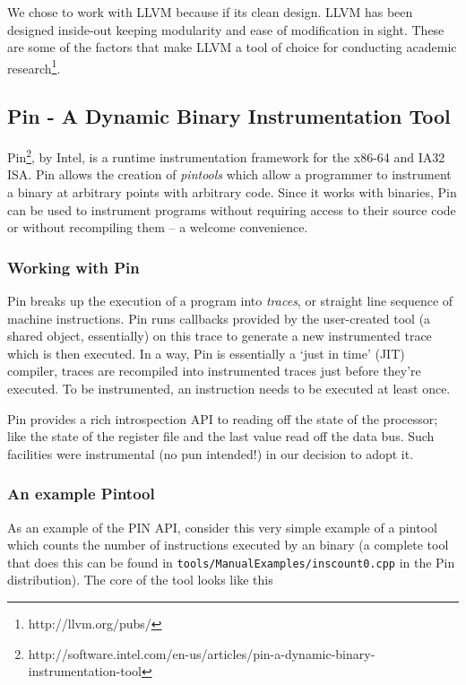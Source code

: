 We chose to work with LLVM because if its clean design.  LLVM has been
designed inside-out keeping modularity and ease of modification in
sight.  These are some of the factors that make LLVM a tool of choice
for conducting academic research\footnote{http://llvm.org/pubs/}.

\subsection{Pin - A Dynamic Binary Instrumentation Tool}

Pin\footnote{http://software.intel.com/en-us/articles/pin-a-dynamic-binary-instrumentation-tool},
by Intel, is a runtime instrumentation framework for the x86-64 and
IA32 ISA.  Pin allows the creation of \textit{pintools} which allow a
programmer to instrument a binary at arbitrary points with arbitrary
code.  Since it works with binaries, Pin can be used to instrument
programs without requiring access to their source code or without
recompiling them -- a welcome convenience.

\subsubsection{Working with Pin}

Pin breaks up the execution of a program into \textit{traces}, or
straight line sequence of machine instructions.  Pin runs callbacks
provided by the user-created tool (a shared object, essentially) on
this trace to generate a new instrumented trace which is then
executed.  In a way, Pin is essentially a `just in time' (JIT)
compiler, traces are recompiled into instrumented traces just before
they're executed.  To be instrumented, an instruction needs to be
executed at least once.

Pin provides a rich introspection API to reading off the state of the
processor; like the state of the register file and the last value read
off the data bus.  Such facilities were instrumental (no pun
intended!) in our decision to adopt it.

\subsubsection{An example Pintool}

As an example of the PIN API, consider this very simple example of a
pintool which counts the number of instructions executed by an binary
(a complete tool that does this can be found in
\texttt{tools/ManualExamples/inscount0.cpp} in the Pin distribution).
The core of the tool looks like this

